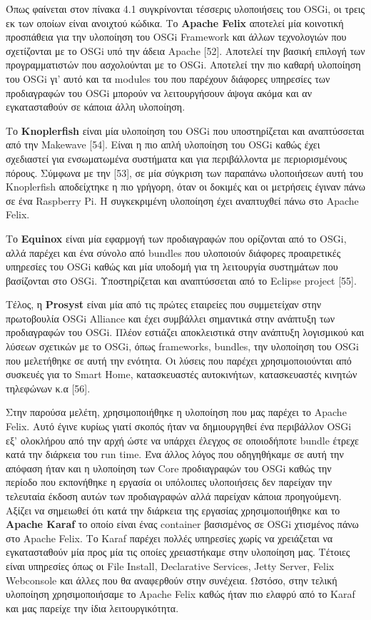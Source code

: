 Όπως φαίνεται στον πίνακα 4.1 συγκρίνονται τέσσερις υλοποιήσεις του OSGi, οι τρεις εκ των οποίων είναι ανοιχτού κώδικα. Το \textbf{Apache Felix} αποτελεί μία κοινοτική προσπάθεια για την υλοποίηση του OSGi Framework και άλλων τεχνολογιών που σχετίζονται με το OSGi υπό την άδεια Apache [52]. Αποτελεί την βασική επιλογή των προγραμματιστών που ασχολούνται με το OSGi. Αποτελεί την πιο καθαρή υλοποίηση του OSGi γι’ αυτό και τα modules του που παρέχουν διάφορες υπηρεσίες των προδιαγραφών του OSGi μπορούν να λειτουργήσουν άψογα ακόμα και αν εγκατασταθούν σε κάποια άλλη υλοποίηση. 

	Το \textbf{Knoplerfish} είναι μία υλοποίηση του OSGi που υποστηρίζεται και αναπτύσσεται από την Makewave [54]. Είναι η πιο απλή υλοποίηση του OSGi καθώς έχει σχεδιαστεί για ενσωματωμένα συστήματα και για περιβάλλοντα με περιορισμένους πόρους. Σύμφωνα με την [53], σε μία σύγκριση των παραπάνω υλοποιήσεων αυτή του Knoplerfish αποδείχτηκε η πιο γρήγορη, όταν οι δοκιμές και οι μετρήσεις έγιναν πάνω σε ένα Raspberry Pi. Η συγκεκριμένη υλοποίηση έχει αναπτυχθεί πάνω στο Apache Felix. 

	Το \textbf{Equinox} είναι μία εφαρμογή των προδιαγραφών που ορίζονται από το OSGi, αλλά παρέχει και ένα σύνολο από bundles που υλοποιούν διάφορες προαιρετικές υπηρεσίες του OSGi καθώς και μία υποδομή για τη λειτουργία συστημάτων που βασίζονται στο OSGi. Υποστηρίζεται και αναπτύσσεται από το Eclipse project [55].

	Τέλος, η \textbf{Prosyst} είναι μία από τις πρώτες εταιρείες που συμμετείχαν στην πρωτοβουλία OSGi Alliance και έχει συμβάλλει σημαντικά στην ανάπτυξη των προδιαγραφών του OSGi. Πλέον εστιάζει αποκλειστικά στην ανάπτυξη λογισμικού και λύσεων σχετικών με το OSGi, όπως frameworks, bundles, την υλοποίηση του OSGi που μελετήθηκε σε αυτή την ενότητα. Οι λύσεις που παρέχει χρησιμοποιούνται από συσκευές για το Smart Home, κατασκευαστές αυτοκινήτων, κατασκευαστές κινητών τηλεφώνων κ.α [56]. 

	Στην παρούσα μελέτη, χρησιμοποιήθηκε η υλοποίηση που μας παρέχει το Apache Felix. Αυτό έγινε κυρίως γιατί σκοπός ήταν να δημιουργηθεί ένα περιβάλλον OSGi εξ’ ολοκλήρου από την αρχή ώστε να υπάρχει έλεγχος σε οποιοδήποτε bundle έτρεχε κατά την διάρκεια του run time. Ένα άλλος λόγος που οδηγηθήκαμε σε αυτή την απόφαση ήταν και η υλοποίηση των Core προδιαγραφών του OSGi καθώς την περίοδο που εκπονήθηκε η εργασία οι υπόλοιπες υλοποιήσεις δεν παρείχαν την τελευταία έκδοση αυτών των προδιαγραφών αλλά παρείχαν κάποια προηγούμενη. Αξίζει να σημειωθεί ότι κατά την διάρκεια της εργασίας χρησιμοποιήθηκε και το \textbf{Apache Karaf }το οποίο είναι ένας container βασισμένος σε OSGi χτισμένος πάνω στο Apache Felix. Το Karaf παρέχει πολλές υπηρεσίες χωρίς να χρειάζεται να εγκατασταθούν μία προς μία τις οποίες χρειαστήκαμε στην υλοποίηση μας. Τέτοιες είναι υπηρεσίες όπως οι File Install, Declarative Services, Jetty Server, Felix Webconsole και άλλες που θα αναφερθούν στην συνέχεια. Ωστόσο, στην τελική υλοποίηση χρησιμοποιήσαμε το Apache Felix καθώς ήταν πιο ελαφρύ από το Karaf και μας παρείχε την ίδια λειτουργικότητα.
